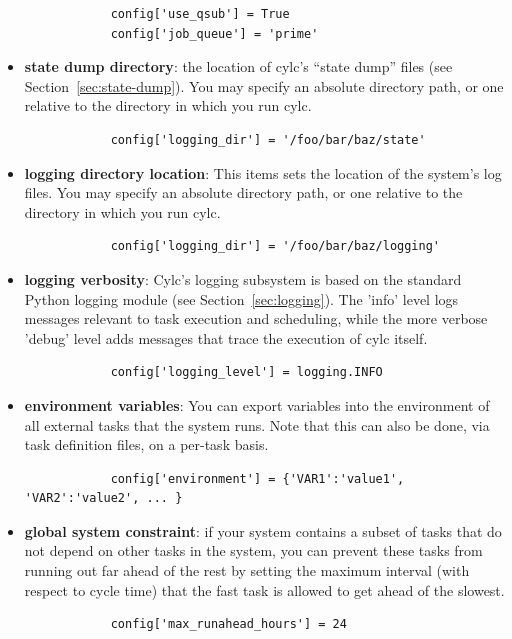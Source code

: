 \documentclass[11pt,a4paper]{article}
\begin{document}
\begin{itemize}
        \begin{lstlisting}
            config['use_qsub'] = True
            config['job_queue'] = 'prime'
        \end{lstlisting}

    \item {\bf state dump directory}: the location of cylc's ``state
        dump'' files (see Section~\ref{sec:state-dump}).  You may
        specify an absolute directory path, or one relative to the
        directory in which you run cylc.
        
        \begin{lstlisting}
            config['logging_dir'] = '/foo/bar/baz/state'
        \end{lstlisting}


    \item {\bf logging directory location}: 
        This items sets the location of the system's log files. You may
        specify an absolute directory path, or one relative to the
        directory in which you run cylc.

        \begin{lstlisting}
            config['logging_dir'] = '/foo/bar/baz/logging'
        \end{lstlisting}

    \item {\bf logging verbosity}: Cylc's logging subsystem is based on
        the standard Python logging module (see
        Section~\ref{sec:logging}). The 'info' level logs messages
        relevant to task execution and scheduling, while the more
        verbose 'debug' level adds messages that trace the execution of
        cylc itself.

        \begin{lstlisting}
            config['logging_level'] = logging.INFO
        \end{lstlisting}

    \item {\bf environment variables}: You can export variables into the 
        environment of all external tasks that the system runs. Note that
        this can also be done, via task definition files, on a per-task
        basis.

        \begin{lstlisting}
            config['environment'] = {'VAR1':'value1', 'VAR2':'value2', ... }
        \end{lstlisting}

    \item {\bf global system constraint}: if your system contains a
        subset of tasks that do not depend on other tasks in the system, 
        you can prevent these tasks from running out far ahead of the 
        rest by setting the maximum interval (with respect to cycle
        time) that the fast task is allowed to get ahead of the slowest.
        
        \begin{lstlisting}
            config['max_runahead_hours'] = 24
        \end{lstlisting}

\end{itemize}
\end{document}
